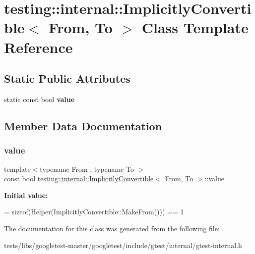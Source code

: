\hypertarget{classtesting_1_1internal_1_1ImplicitlyConvertible}{}\section{testing\+:\+:internal\+:\+:Implicitly\+Convertible$<$ From, To $>$ Class Template Reference}
\label{classtesting_1_1internal_1_1ImplicitlyConvertible}
\subsection*{Static Public Attributes}
\begin{DoxyCompactItemize}
\item 
static const bool {\bfseries value}
\end{DoxyCompactItemize}


\subsection{Member Data Documentation}
\mbox{\label{classtesting_1_1internal_1_1ImplicitlyConvertible_aea51cecabca681fb75659e224771b7b7}} 
\subsubsection{\texorpdfstring{value}{value}}
{\footnotesize\ttfamily template$<$typename From , typename To $>$ \\
const bool \hyperlink{classtesting_1_1internal_1_1ImplicitlyConvertible}{testing\+::internal\+::\+Implicitly\+Convertible}$<$ From, \hyperlink{classtesting_1_1internal_1_1To}{To} $>$\+::value\hspace{0.3cm}{\ttfamily [static]}}

{\bfseries Initial value\+:}
\begin{DoxyCode}
=
      \textcolor{keyword}{sizeof}(Helper(ImplicitlyConvertible::MakeFrom())) == 1
\end{DoxyCode}


The documentation for this class was generated from the following file\+:\begin{DoxyCompactItemize}
\item 
tests/libs/googletest-\/master/googletest/include/gtest/internal/gtest-\/internal.\+h\end{DoxyCompactItemize}
